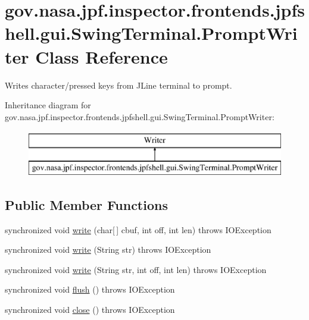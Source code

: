\hypertarget{classgov_1_1nasa_1_1jpf_1_1inspector_1_1frontends_1_1jpfshell_1_1gui_1_1_swing_terminal_1_1_prompt_writer}{}\section{gov.\+nasa.\+jpf.\+inspector.\+frontends.\+jpfshell.\+gui.\+Swing\+Terminal.\+Prompt\+Writer Class Reference}
\label{classgov_1_1nasa_1_1jpf_1_1inspector_1_1frontends_1_1jpfshell_1_1gui_1_1_swing_terminal_1_1_prompt_writer}


Writes character/pressed keys from J\+Line terminal to prompt.  


Inheritance diagram for gov.\+nasa.\+jpf.\+inspector.\+frontends.\+jpfshell.\+gui.\+Swing\+Terminal.\+Prompt\+Writer\+:\begin{figure}[H]
\begin{center}
\leavevmode
\includegraphics[height=2.000000cm]{classgov_1_1nasa_1_1jpf_1_1inspector_1_1frontends_1_1jpfshell_1_1gui_1_1_swing_terminal_1_1_prompt_writer}
\end{center}
\end{figure}
\subsection*{Public Member Functions}
\begin{DoxyCompactItemize}
\item 
synchronized void \hyperlink{classgov_1_1nasa_1_1jpf_1_1inspector_1_1frontends_1_1jpfshell_1_1gui_1_1_swing_terminal_1_1_prompt_writer_a5f781bc39489b69a420bb459d944154f}{write} (char\mbox{[}$\,$\mbox{]} cbuf, int off, int len)  throws I\+O\+Exception 
\item 
synchronized void \hyperlink{classgov_1_1nasa_1_1jpf_1_1inspector_1_1frontends_1_1jpfshell_1_1gui_1_1_swing_terminal_1_1_prompt_writer_a98f69ecec260fe47db6930927f159a95}{write} (String str)  throws I\+O\+Exception 
\item 
synchronized void \hyperlink{classgov_1_1nasa_1_1jpf_1_1inspector_1_1frontends_1_1jpfshell_1_1gui_1_1_swing_terminal_1_1_prompt_writer_a08a332215b18fcee0558eaa820fbc3b5}{write} (String str, int off, int len)  throws I\+O\+Exception 
\item 
synchronized void \hyperlink{classgov_1_1nasa_1_1jpf_1_1inspector_1_1frontends_1_1jpfshell_1_1gui_1_1_swing_terminal_1_1_prompt_writer_a936f2883d1d4ea7311766ac61eb52d44}{flush} ()  throws I\+O\+Exception 
\item 
synchronized void \hyperlink{classgov_1_1nasa_1_1jpf_1_1inspector_1_1frontends_1_1jpfshell_1_1gui_1_1_swing_terminal_1_1_prompt_writer_a80ada40242feeecefab5bf66686a2463}{close} ()  throws I\+O\+Exception 
\end{DoxyCompactItemize}


